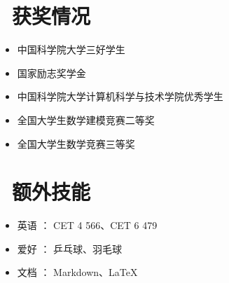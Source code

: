 \documentclass{resume}
\begin{document}

\section{\faHeartO\ 获奖情况}
\begin{itemize}[parsep=0.5ex]
  \item 中国科学院大学三好学生
  \item 国家励志奖学金
  \item 中国科学院大学计算机科学与技术学院优秀学生
  \item 全国大学生数学建模竞赛二等奖
  \item 全国大学生数学竞赛三等奖
\end{itemize}

\section{\faCogs\ 额外技能}
\begin{itemize}[parsep=0.5ex]
  \item 英语 ：		   CET 4 566、CET 6 479
  \item 爱好 ：		   乒乓球、羽毛球
  \item 文档 ：		   Markdown、\LaTeX
\end{itemize}



%
%
\end{document}
